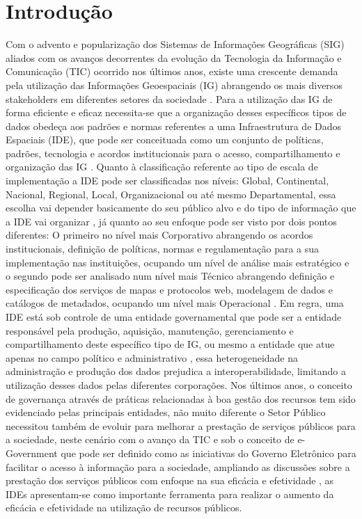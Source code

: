 \documentclass[final,authoryear,5p,times,twocolumn, 12pt]{elsarticle}
\begin{document}

\section{Introdu\c{c}\~ao}
\label{sec1}

Com o advento e popularização dos Sistemas de Informações Geográficas (SIG) aliados com os avanços decorrentes da evolução da Tecnologia da Informação e Comunicação (TIC) ocorrido nos últimos anos, existe uma crescente demanda pela utilização das Informações Geoespaciais (IG) abrangendo os mais diversos stakeholders em diferentes setores da sociedade \citep{Macharis2014AFlanders}. Para a utilização das IG de forma eficiente e eficaz necessita-se que a organização desses específicos tipos de dados obedeça aos padrões e normas referentes a uma Infraestrutura de Dados Espaciais (IDE), que pode ser conceituada como um conjunto de políticas, padrões, tecnologia e acordos institucionais para o acesso, compartilhamento e organização das IG \citep{DAmore2012ICTManagement, Kobben2013TowardsInfrastructure, Stock2012ToInfrastructure}.
Quanto à classificação referente ao tipo de escala de implementação a IDE pode ser classificadas nos níveis: Global, Continental, Nacional, Regional, Local, Organizacional ou até mesmo Departamental, essa escolha vai depender basicamente do seu público alvo e do tipo de informação que a IDE vai organizar \citep{Bejar2012AnInfrastructures}, já quanto ao seu enfoque pode ser visto por dois pontos diferentes: O primeiro no nível mais Corporativo abrangendo os acordos institucionais, definição de políticas, normas e regulamentação para a sua implementação nas instituições, ocupando um nível de análise mais estratégico e o segundo pode ser analisado num nível mais Técnico abrangendo definição e especificação dos serviços de mapas e protocolos web, modelagem de dados e catálogos de metadados, ocupando um nível mais Operacional \citep{Cooper2013AViewpoint}. 
Em regra, uma IDE está sob controle de uma entidade governamental que pode ser a entidade responsável pela produção, aquisição, manutenção, gerenciamento e compartilhamento deste específico tipo de IG, ou mesmo a entidade que atue apenas no campo político e administrativo \citep{Grus2011AnGoals}, essa heterogeneidade na administração e produção dos dados prejudica a interoperabilidade, limitando a utilização desses dados pelas diferentes corporações. Nos últimos anos, o conceito de governança através de práticas relacionadas à boa gestão dos recursos tem sido evidenciado pelas principais entidades, não muito diferente o Setor Público necessitou também de evoluir para melhorar a prestação de serviços públicos para a sociedade, neste cenário com o avanço da TIC e sob o conceito de e-Government que pode ser definido como as iniciativas do Governo Eletrônico para facilitar o acesso à informação para a sociedade, ampliando as discussões sobre a prestação dos serviços públicos com enfoque na sua eficácia e efetividade \citep{Borzacchiello2013EstimatingE-Cadastres}, as IDEs apresentam-se como importante ferramenta para realizar o aumento da eficácia e efetividade na utilização de recursos públicos.
\end{document}
